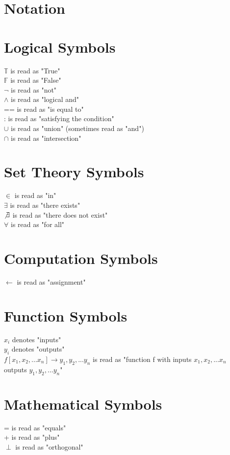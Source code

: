 \documentclass[11pt]{article}
\begin{document}
\section*{Notation}



\section*{Logical Symbols}
$\mathbb{T}$ is read as "True"\\
$\mathbb{F}$ is read as "False"\\
$\lnot$ is read as "not"\\
$\land$ is read as "logical and"\\
== is read as "is equal to"\\
: is read as "satisfying the condition"\\
$\cup$ is read as "union" (sometimes read as "and")\\
$\cap$ is read as "intersection"



\section*{Set Theory Symbols}
$\in$ is read as "in"\\
$\exists$ is read as "there exists"\\
$\not \exists$ is read as "there does not exist"\\
$\forall$ is read as "for all"\\



\section*{Computation Symbols}
$\leftarrow$ is read as "assignment"\\





\section*{Function Symbols}
$x_i$ denotes "inputs"\\
$y_i$ denotes "outputs"\\
$f[x_1,x_2,...x_n] \rightarrow y_1, y_2,...y_n$ \hspace{1.5mm} is read as "function f with inputs $x_1,x_2,...x_n$ outputs $y_1,y_2,...y_n$"\\










\section*{Mathematical Symbols}
= is read as "equals"\\
+ is read as "plus"\\
$\perp$ is read as "orthogonal"
\end{document}
